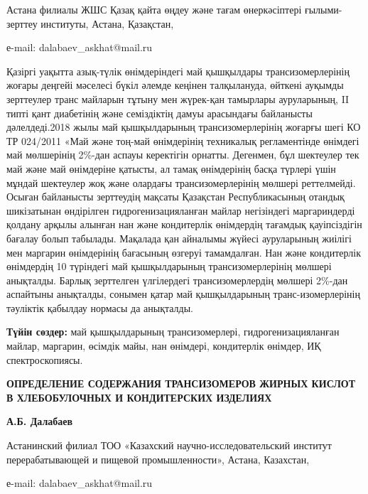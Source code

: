 \begin{affiliation}
Астана филиалы ЖШС Қазақ қайта өңдеу және тағам
өнеркәсіптері ғылыми-зерттеу институты, Астана, Қазақстан,

е-mail: dalabaev\_askhat@mail.ru
\end{affiliation}

Қазіргі уақытта азық-түлік өнімдеріндегі май қышқылдары
трансизомерлерінің жоғары деңгейі мәселесі бүкіл әлемде кеңінен
талқылануда, өйткені ауқымды зерттеулер транс майларын тұтыну мен
жүрек-қан тамырлары ауруларының, II типті қант диабетінің және
семіздіктің дамуы арасындағы байланысты дәлелдеді.2018 жылы май
қышқылдарының трансизомерлерінің жоғарғы шегі КО ТР 024/2011 «Май және
тоң-май өнімдерінің техникалық регламентінде өнімдегі май мөлшерінің
2\%-дан аспауы керектігін орнатты. Дегенмен, бұл шектеулер тек май және
май өнімдеріне қатысты, ал тамақ өнімдерінің басқа түрлері үшін мұндай
шектеулер жоқ және олардағы трансизомерлерінің мөлшері реттелмейді.
Осыған байланысты зерттеудің мақсаты Қазақстан Республикасының отандық
шикізатынан өндірілген гидрогенизацияланған майлар негізіндегі
маргариндерді қолдану арқылы алынған нан және кондитерлік өнімдердің
тағамдық қауіпсіздігін бағалау болып табылады. Мақалада қан айналымы
жүйесі ауруларының жиілігі мен маргарин өнімдерінің бағасының өзгеруі
тамамдалған. Нан және кондитерлік өнімдердің 10 түріндегі май
қышқылдарының трансизомерлерінің мөлшері анықталды. Барлық зерттелген
үлгілердегі трансизомерлердің мөлшері 2\%-дан аспайтыны анықталды,
сонымен қатар май қышқылдарының транс-изомерлерінің тәуліктік қабылдау
нормасы да анықталды.

{\bfseries Түйін сөздер:} май қышқылдарының трансизомерлері,
гидрогенизацияланған майлар, маргарин, өсімдік майы, нан өнімдері,
кондитерлік өнімдер, ИҚ спектроскопиясы.

\begin{articleheader}
{\bfseries ОПРЕДЕЛЕНИЕ СОДЕРЖАНИЯ ТРАНСИЗОМЕРОВ ЖИРНЫХ КИСЛОТ В
ХЛЕБОБУЛОЧНЫХ И КОНДИТЕРСКИХ ИЗДЕЛИЯХ}

{\bfseries А.Б. Далабаев}
\end{articleheader}

\begin{affiliation}
Астанинский филиал ТОО «Казахский
научно-исследовательский институт перерабатывающей и пищевой
промышленности», Астана, Казахстан,

е-mail: dalabaev\_askhat@mail.ru
\end{affiliation}

